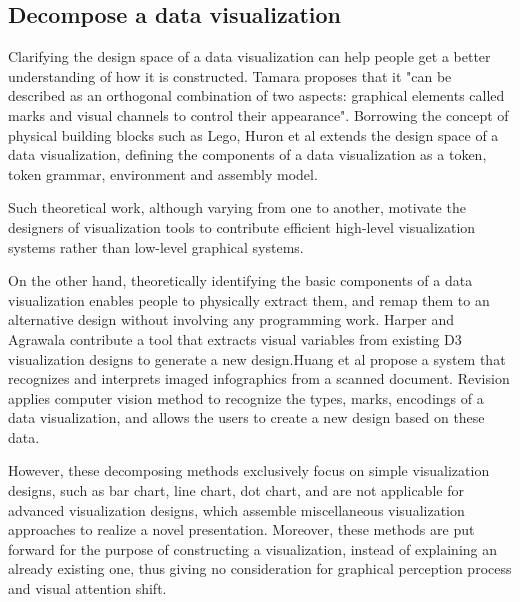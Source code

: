 \subsection{Decompose a data visualization}
Clarifying the design space of a data visualization can help people get a better understanding of how it is constructed. Tamara \cite{munzner_visualization_2014} proposes that it "can be described as an orthogonal combination of two aspects: graphical elements called marks and visual channels to control their appearance". Borrowing the concept of physical building blocks such as Lego, Huron et al \cite{huron_constructive_2014} extends the design space of a data visualization, defining the components of a data visualization as a token, token grammar, environment and assembly model.\par 
Such theoretical work, although varying from one to another, motivate the designers of visualization tools to contribute efficient high-level visualization systems rather than low-level graphical systems.\cite{bostock_protovis:_2009,mendez_ivolver:_2016} \par 
On the other hand, theoretically identifying the basic components of a data visualization enables people to physically extract them, and remap them to an alternative design without involving any programming work. Harper and Agrawala \cite{harper_deconstructing_2014} contribute a tool that extracts visual variables from existing D3 visualization designs to generate a new design.Huang et al\cite{Huang:2007:SUI:1284420.1284427} propose a system that recognizes and interprets imaged
infographics from a scanned document. Revision\cite{savva_revision:_2011} applies computer vision method to recognize the types, marks, encodings of a data visualization, and allows the users to create a new design based on these data. \par 
However, these decomposing methods exclusively focus on simple visualization designs, such as bar chart, line chart, dot chart, and are not applicable for advanced visualization designs, which assemble miscellaneous visualization approaches to realize a novel presentation. Moreover, these methods are put forward for the purpose of constructing a visualization, instead of explaining an already existing one, thus giving no consideration for graphical perception process and visual attention shift.\par 

